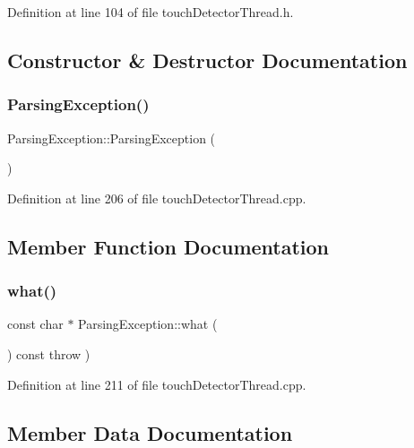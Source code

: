 Definition at line 104 of file touch\+Detector\+Thread.\+h.



\subsection{Constructor \& Destructor Documentation}
\mbox{\label{classParsingException_a58f3455a94daadc74646f40d76ecb07c}} 
\subsubsection{\texorpdfstring{Parsing\+Exception()}{ParsingException()}}
{\footnotesize\ttfamily Parsing\+Exception\+::\+Parsing\+Exception (\begin{DoxyParamCaption}{ }\end{DoxyParamCaption})}



Definition at line 206 of file touch\+Detector\+Thread.\+cpp.



\subsection{Member Function Documentation}
\mbox{\label{classParsingException_a4e8e701c3b59557a8b81bff868ed0d09}} 
\subsubsection{\texorpdfstring{what()}{what()}}
{\footnotesize\ttfamily const char $\ast$ Parsing\+Exception\+::what (\begin{DoxyParamCaption}{ }\end{DoxyParamCaption}) const throw  ) \hspace{0.3cm}{\ttfamily [virtual]}}



Definition at line 211 of file touch\+Detector\+Thread.\+cpp.



\subsection{Member Data Documentation}
\mbox{\label{classParsingException_a1ad6253d81cc001cc9a6c6e318a3e1c2}} 
